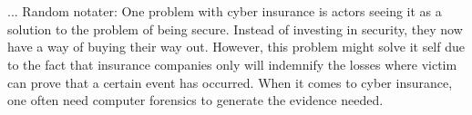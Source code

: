    
 



\\
\\
... Random notater: One problem with cyber insurance is actors seeing it as a solution to the problem of being secure. Instead of investing in security, they now have a way of buying their way out. However, this problem might solve it self due to the fact that insurance companies only will indemnify the losses where victim can prove that a certain event has occurred. When it comes to cyber insurance, one often need computer forensics to generate the evidence needed. 














